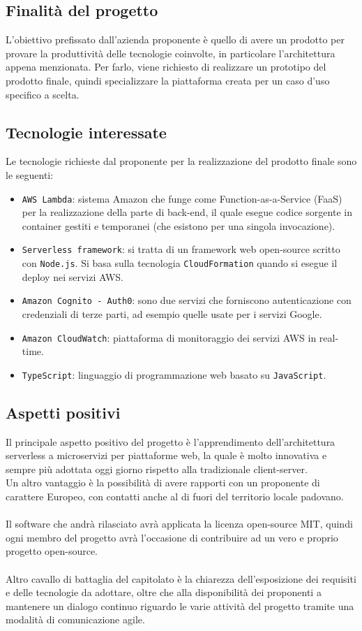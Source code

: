 \subsection{Finalità del progetto}
L'obiettivo prefissato dall'azienda proponente è quello di avere un prodotto per provare la produttività delle tecnologie coinvolte, in particolare l'architettura appena menzionata. Per farlo, viene richiesto di realizzare un prototipo del prodotto finale, quindi specializzare la piattaforma creata per un caso d'uso specifico a scelta.

\subsection{Tecnologie interessate}
Le tecnologie richieste dal proponente per la realizzazione del prodotto finale sono le seguenti:
\begin{itemize}
	\item \verb|AWS Lambda|: sistema Amazon che funge come Function-as-a-Service (FaaS) per la realizzazione della parte di back-end, il quale esegue codice sorgente in container gestiti e temporanei (che esistono per una singola invocazione).
	\item \verb|Serverless framework|: si tratta di un framework web open-source scritto con \verb|Node.js|. Si basa sulla tecnologia \verb|CloudFormation| quando si esegue il deploy nei servizi AWS.
	\item \verb|Amazon Cognito - Auth0|: sono due servizi che forniscono autenticazione con credenziali di terze parti, ad esempio quelle usate per i servizi Google.
	\item \verb|Amazon CloudWatch|: piattaforma di monitoraggio dei servizi AWS in real-time.
	\item \verb|TypeScript|: linguaggio di programmazione web basato su \verb|JavaScript|.
\end{itemize}

\subsection{Aspetti positivi}
Il principale aspetto positivo del progetto è l'apprendimento dell'architettura serverless a microservizi per piattaforme web, la quale è molto innovativa e sempre più adottata oggi giorno rispetto alla tradizionale client-server.\\
Un altro vantaggio è la possibilità di avere rapporti con un proponente di carattere Europeo, con contatti anche al di fuori del territorio locale padovano.\\\\
Il software che andrà rilasciato avrà applicata la licenza open-source MIT, quindi ogni membro del progetto avrà l'occasione di contribuire ad un vero e proprio progetto open-source.\\\\
Altro cavallo di battaglia del capitolato è la chiarezza dell'esposizione dei requisiti e delle tecnologie da adottare, oltre che alla disponibilità dei proponenti a mantenere un dialogo continuo riguardo le varie attività del progetto tramite una modalità di comunicazione agile.

